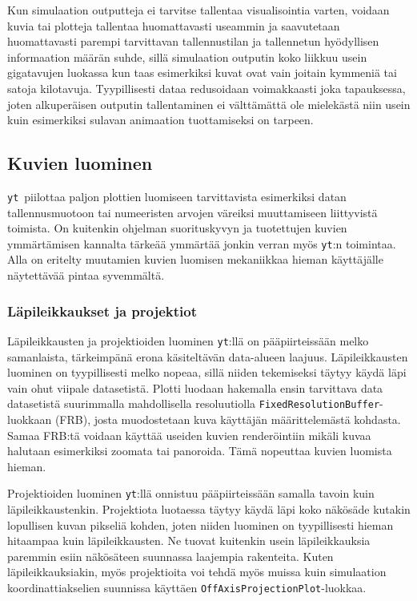 \documentclass[12pt,a4paper]{article}
\newcommand{\yt}{\texttt{yt}}
\begin{document}
Kun simulaation outputteja ei tarvitse tallentaa visualisointia varten, voidaan kuvia tai plotteja tallentaa huomattavasti useammin ja saavutetaan huomattavasti parempi tarvittavan tallennustilan ja tallennetun hyödyllisen informaation määrän suhde, sillä simulaation outputin koko liikkuu usein gigatavujen luokassa kun taas esimerkiksi kuvat ovat vain joitain kymmeniä tai satoja kilotavuja. Tyypillisesti dataa redusoidaan voimakkaasti joka tapauksessa, joten alkuperäisen outputin tallentaminen ei välttämättä ole mielekästä niin usein kuin esimerkiksi sulavan animaation tuottamiseksi on tarpeen. \cite{yt}

\subsection{Kuvien luominen}
\yt\ piilottaa paljon plottien luomiseen tarvittavista esimerkiksi datan tallennusmuotoon tai numeeristen arvojen väreiksi muuttamiseen liittyvistä toimista. On kuitenkin ohjelman suorituskyvyn ja tuotettujen kuvien ymmärtämisen kannalta tärkeää ymmärtää jonkin verran myös \yt :n toimintaa. Alla on eritelty muutamien kuvien luomisen mekaniikkaa hieman käyttäjälle näytettävää pintaa syvemmältä.

\subsubsection{Läpileikkaukset ja projektiot}
Läpileikkausten ja projektioiden luominen \yt :llä on pääpiirteissään melko samanlaista, tärkeimpänä erona käsiteltävän data-alueen laajuus. Läpi\-leikkausten luominen on tyypillisesti melko nopeaa, sillä niiden tekemiseksi täytyy käydä läpi vain ohut viipale datasetistä. Plotti luodaan hakemalla ensin tarvittava data datasetistä suurimmalla mahdollisella resoluutiolla \texttt{Fixed\-Resolution\-Buffer}-luokkaan (FRB), josta muodostetaan kuva käyttäjän määrittelemästä kohdasta. Samaa FRB:tä voidaan käyttää useiden kuvien renderöintiin mikäli kuvaa halutaan esimerkiksi zoomata tai panoroida. Tämä nopeuttaa kuvien luomista hieman. \cite{sliceproj}

Projektioiden luominen \yt :llä onnistuu pääpiirteissään samalla tavoin kuin läpi\-leik\-kaus\-ten\-kin. Projektiota luotaessa täytyy käydä läpi koko näkösäde kutakin lopullisen kuvan pikseliä kohden, joten niiden luominen on tyypillisesti hieman hitaampaa kuin läpi\-leikkausten. Ne tuovat kuitenkin usein läpileikkauksia paremmin esiin näkösäteen suunnassa laajempia rakenteita. Kuten läpileikkauksiakin, myös projektioita voi tehdä myös muissa kuin simulaation koordinattiakselien suunnissa käyttäen \texttt{OffAxisProjectionPlot}-luokkaa. \cite{sliceproj}
\end{document}
